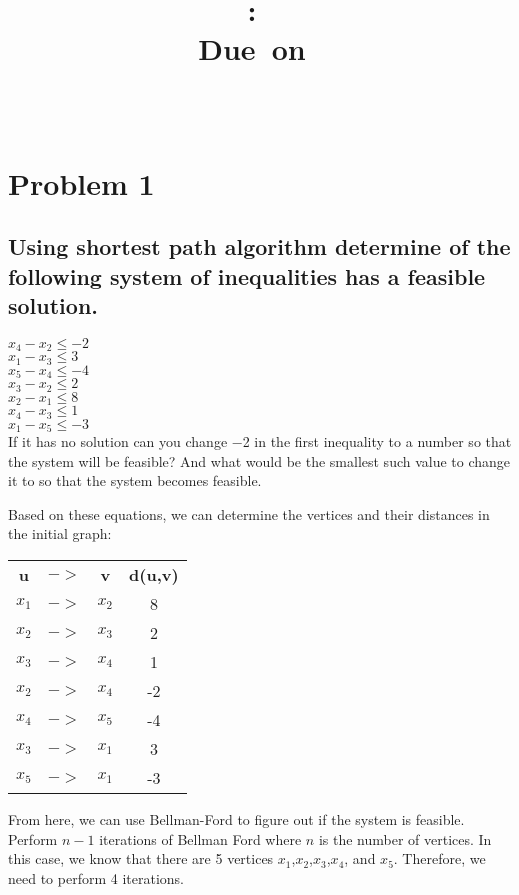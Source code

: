 \documentclass{article}
\title{
    \vspace{2in}
    \textmd{\textbf{\hmwkClass:\ \hmwkTitle}}\\
    \normalsize\vspace{0.1in}\small{Due\ on\ \hmwkDueDate}\\
    \vspace{0.1in}\large{\textit{\hmwkClassInstructor\ \hmwkClassTime}}
    \vspace{3in}
}
\author{\hmwkAuthorName}
\date{}
\begin{document}
\maketitle
\pagebreak

\section*{Problem 1}
\subsection*{Using shortest path algorithm determine of the following system of inequalities has a feasible solution.}
$x_4 - x_2 \leq −2$\\
$x_1 - x_3 \leq 3$\\
$x_5 - x_4  \leq -4$\\
$x_3 - x_2 \leq 2$\\
$x_2 - x_1 \leq 8$\\
$x_4 - x_3 \leq 1$\\
$x_1 - x_5 \leq −3$\\

If it has no solution can you change −2 in the first inequality to a number so that the system will be feasible? And what would be the smallest such value to change it to so that the system becomes feasible.

Based on these equations, we can determine the vertices and their distances in the initial graph:\\

\begin{center}
	\begin{tabular}{c c c c}
		\textbf{u} &\textbf{$->$} &\textbf{v} &\textbf{d(u,v)}\\
        $x_1$ &$->$& $x_2$ & 8\\
        $x_2$ &$->$& $x_3$ & 2\\
        $x_3$ &$->$& $x_4$ & 1\\
        $x_2$ &$->$& $x_4$ & -2\\
        $x_4$ &$->$& $x_5$ & -4\\
        $x_3$ &$->$& $x_1$ & 3\\
        $x_5$ &$->$& $x_1$ & -3\\
	\end{tabular}
    
\end{center}

From here, we can use Bellman-Ford to figure out if the system is feasible. Perform $n-1$ iterations of Bellman Ford where $n$ is the number of vertices. In this case, we know that there are 5 vertices $x_1$,$x_2$,$x_3$,$x_4$, and $x_5$. Therefore, we need to perform 4 iterations.\\
\end{document}
